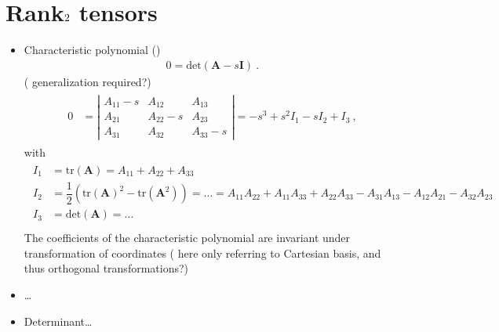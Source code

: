\documentclass[letterpaper,10pt,english]{jupyterBook}
\begin{document}
\section{Rank\sphinxhyphen{}\protect\(2\protect\) tensors}
\label{\detokenize{ch/tensor-algebra-calculus/tensor-invariants:rank-2-tensors}}\begin{itemize}
\item {} 
\sphinxAtStartPar
Characteristic polynomial ()
\begin{equation*}
\begin{split}0 = \text{det}\left( \mathbf{A} - s \mathbf{I} \right) \ .\end{split}
\end{equation*}
\sphinxAtStartPar
{} ( generalization required?)
\begin{equation*}
\begin{split}\begin{aligned}
   0 
   & = \left|\begin{matrix}
     A_{11} - s & A_{12}     & A_{13}     \\
     A_{21}     & A_{22} - s & A_{23}     \\
     A_{31}     & A_{32}     & A_{33} - s
   \end{matrix}\right|
   = - s^3 + s^2 I_1 - s I_2 + I_3 \ ,
   \end{aligned}\end{split}
\end{equation*}
\sphinxAtStartPar
with
\begin{equation*}
\begin{split}\begin{aligned}
     I_1 & = \text{tr}(\mathbf{A}) = A_{11} + A_{22} + A_{33} \\
     I_2 & = \dfrac{1}{2} \left( \text{tr}(\mathbf{A})^2 - \text{tr}(\mathbf{A}^2) \right) = \dots = A_{11} A_{22} + A_{11} A_{33} + A_{22} A_{33} - A_{31} A_{13} - A_{12} A_{21} - A_{32} A_{23} \\
     I_3 & = \text{det}(\mathbf{A}) = \dots \\
   \end{aligned}\end{split}
\end{equation*}
\sphinxAtStartPar
The coefficients of the characteristic polynomial are invariant under transformation of coordinates ( here only referring to Cartesian basis, and thus orthogonal transformations?)

\item {} 
\sphinxAtStartPar
{}…

\item {} 
\sphinxAtStartPar
Determinant…

\end{itemize}
\end{document}
